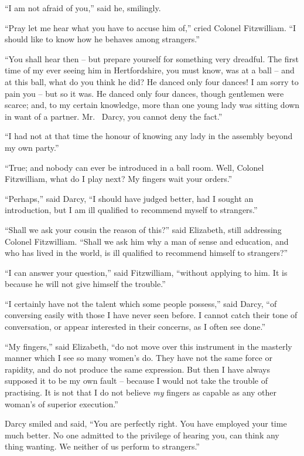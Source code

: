 “I am not afraid of you,” said he, smilingly.

“Pray let me hear what you have to accuse him of,”
cried Colonel Fitzwilliam. “I should like to know how
he behaves among strangers.”

“You shall hear then -- but prepare yourself for something
very dreadful. The first time of my ever seeing
him in Hertfordshire, you must know, was at a ball -- and
at this ball, what do you think he did? He danced
only four dances! I am sorry to pain you -- but so it was.
He danced only four dances, though gentlemen were
scarce; and, to my certain knowledge, more than one
young lady was sitting down in want of a partner. Mr.\ %
Darcy, you cannot deny the fact.”

“I had not at that time the honour of knowing any
lady in the assembly beyond my own party.”

“True; and nobody can ever be introduced in a ball
room. Well, Colonel Fitzwilliam, what do I play next?
My fingers wait your orders.”

“Perhaps,” said Darcy, “I should have judged better,
had I sought an introduction, but I am ill qualified to
recommend myself to strangers.”

“Shall we ask your cousin the reason of this?” said
Elizabeth, still addressing Colonel Fitzwilliam. “Shall
we ask him why a man of sense and education, and who
has lived in the world, is ill qualified to recommend himself
to strangers?”

“I can answer your question,” said Fitzwilliam, “without
applying to him. It is because he will not give himself
the trouble.”

“I certainly have not the talent which some people
possess,” said Darcy, “of conversing easily with those
I have never seen before. I cannot catch their tone of
conversation, or appear interested in their concerns, as
I often see done.”

“My fingers,” said Elizabeth, “do not move over this
instrument in the masterly manner which I see so many
women’s do. They have not the same force or rapidity,
and do not produce the same expression. But then I have
always supposed it to be my own fault -- because I would
not take the trouble of practising. It is not that I do not
believe \textit{my} fingers as capable as any other woman’s of
superior execution.”

Darcy smiled and said, “You are perfectly right. You
have employed your time much better. No one admitted
to the privilege of hearing you, can think any thing wanting.
We neither of us perform to strangers.”

